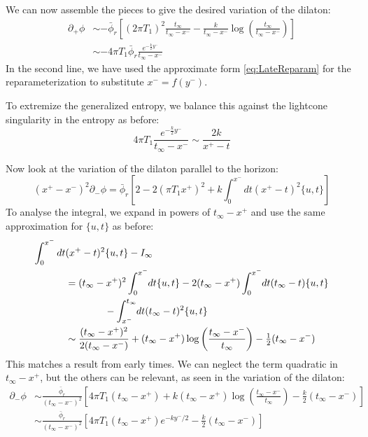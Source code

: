 \documentclass[12pt]{article}
\begin{document}
We can now assemble the pieces to give the desired variation of the dilaton:
\begin{align}
	 \partial_+ \phi &\sim  -\bar{\phi}_r \left[(2\pi T_1)^2\frac{t_\infty}{t_\infty-x^-} - \frac{k}{t_\infty-x^-} \log\left(\frac{t_\infty}{t_\infty-x^-}\right) \right] \\
	 &\sim -4\pi T_1\bar{\phi}_r \frac{ e^{-\frac{k}{2}y^-}}{t_\infty-x^-}
\end{align}
In the second line, we have used the approximate form \eqref{eq:LateReparam} for the reparameterization to substitute $x^- = f(y^-)$.


To extremize the generalized entropy, we balance this against the lightcone singularity in the entropy as before:
\begin{equation}
	4\pi T_1 \frac{ e^{-\frac{k}{2}y^-}}{t_\infty-x^-} \sim \frac{2k}{x^+-t}
\end{equation}

Now look at the variation of the dilaton parallel to the horizon:
\begin{equation}
	(x^+-x^-)^2 \partial_- \phi = \bar{\phi}_r \left[2-2(\pi T_1 x^+)^2 + k \int_0^{x^-} dt (x^+-t)^2 \{u,t\} \right]
\end{equation}
To analyse the integral, we expand in powers of $t_\infty-x^+$ and use the same approximation for $\{u,t\}$ as before:
\begin{align*}
	\int_0^{x^-} dt & (x^+-t)^2 \{u,t\}-I_\infty \\
	&= (t_\infty-x^+)^2 \int_0^{x^-}\mkern-4mu dt  \{u,t\} -2(t_\infty-x^+) \int_0^{x^-}\mkern-4mu dt (t_\infty-t) \{u,t\} \\
	&\qquad\qquad -  \int_{x^-}^{t_\infty}\mkern-4mu dt (t_\infty-t)^2 \{u,t\} \\
	&\sim \frac{(t_\infty - x^+)^2}{2(t_\infty -x^-)} + (t_\infty -x^+)\log\left(\frac{t_\infty -x^-}{t_\infty}\right) -\tfrac{1}{2}(t_\infty -x^-)
\end{align*}
This matches a result from early times. We can neglect the term quadratic in $t_\infty -x^+$, but the others can be relevant, as seen in the variation of the dilaton:
\begin{align*}
	\partial_- \phi &\sim \frac{\bar{\phi}_r}{(t_\infty- x^-)^2} \left[ 4\pi T_1 (t_\infty-x^+) + k(t_\infty -x^+)\log\left(\frac{t_\infty -x^-}{t_\infty}\right) -\tfrac{k}{2}(t_\infty -x^-)\right] \\
	&\sim \frac{\bar{\phi}_r}{(t_\infty- x^-)^2} \left[4\pi T_1 (t_\infty -x^+)e^{-ky^-/2} -\tfrac{k}{2}(t_\infty -x^-)\right]
\end{align*}
\end{document}
